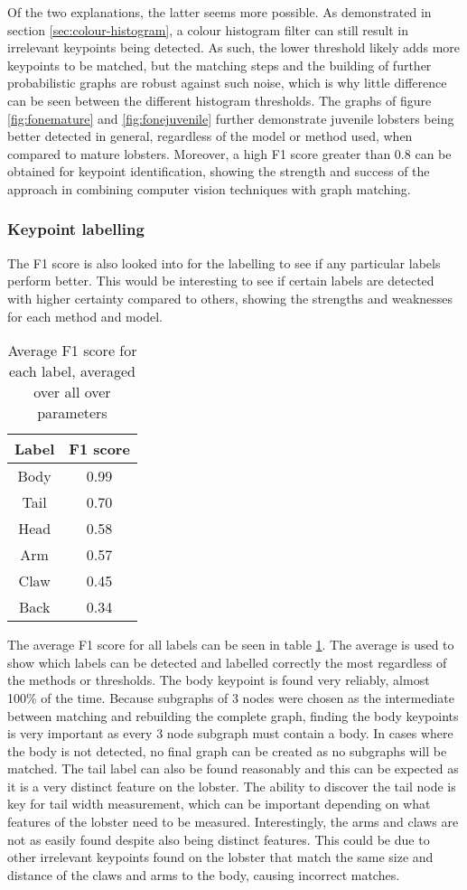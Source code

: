 Of the two explanations, the latter seems more possible. As demonstrated in section \ref{sec:colour-histogram}, a colour histogram filter can still result in irrelevant keypoints being detected. As such, the lower threshold likely adds more keypoints to be matched, but the matching steps and the building of further probabilistic graphs are robust against such noise, which is why little difference can be seen between the different histogram thresholds. 
\n
The graphs of figure \ref{fig:fonemature} and \ref{fig:fonejuvenile} further demonstrate juvenile lobsters being better detected in general, regardless of the model or method used, when compared to mature lobsters. Moreover, a high F1 score greater than 0.8 can be obtained for keypoint identification, showing the strength and success of the approach in combining computer vision techniques with graph matching. 
\subsubsection{Keypoint labelling}
The F1 score is also looked into for the labelling to see if any particular labels perform better. This would be interesting to see if certain labels are detected with higher certainty compared to others, showing the strengths and weaknesses for each method and model.

\begin{table}[H]
\centering
\begin{tabular}{| c | c |}
\hline
\textbf{Label} & \textbf{F1 score} \\
\hline
Body & 0.99 \\
Tail & 0.70 \\
Head & 0.58 \\
Arm & 0.57 \\
Claw & 0.45 \\
Back & 0.34 \\
\hline
\end{tabular}
\caption{Average F1 score for each label, averaged over all over parameters}
\label{tbl:avg-allf1}
\end{table}
\noindent
The average F1 score for all labels can be seen in table \ref{tbl:avg-allf1}. The average is used to show which labels can be detected and labelled correctly the most regardless of the methods or thresholds. The body keypoint is found very reliably, almost 100\% of the time. Because subgraphs of 3 nodes were chosen as the intermediate between matching and rebuilding the complete graph, finding the body keypoints is very important as every 3 node subgraph must contain a body. In cases where the body is not detected, no final graph can be created as no subgraphs will be matched.
\n
The tail label can also be found reasonably and this can be expected as it is a very distinct feature on the lobster. The ability to discover the tail node is key for tail width measurement, which can be important depending on what features of the lobster need to be measured. Interestingly, the arms and claws are not as easily found despite also being distinct features. This could be due to other irrelevant keypoints found on the lobster that match the same size and distance of the claws and arms to the body, causing incorrect matches. 


